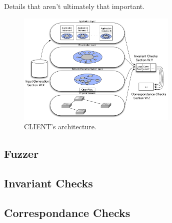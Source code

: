 Details that aren't ultimately that important.

\begin{figure}[t]
    \centering
    \includegraphics[width=3in]{../diagrams/architecture/Architecture_simplified.pdf}
    \caption[]{\label{fig:basicarch} CLIENT's architecture.\vspace{-10pt}} 
\end{figure}


\subsection{Fuzzer}

\subsection{Invariant Checks}

\subsection{Correspondance Checks}

